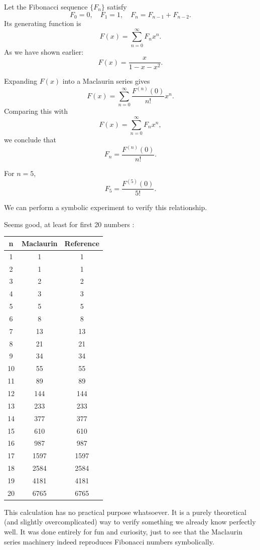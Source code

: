 \documentclass{article}
\begin{document}
Let the Fibonacci sequence \(\{F_n\}\) satisfy
\[
F_0 = 0, \quad F_1 = 1, \quad F_{n} = F_{n-1} + F_{n-2}.
\]
Its generating function is
\[
F(x) = \sum_{n=0}^{\infty} F_n x^n.
\]
As we have shown earlier:
\[
F(x) = \frac{x}{1 - x - x^2}.
\]

Expanding \(F(x)\) into a Maclaurin series gives
\[
F(x) = \sum_{n=0}^{\infty} \frac{F^{(n)}(0)}{n!} x^n.
\]
Comparing this with
\[
F(x) = \sum_{n=0}^{\infty} F_n x^n,
\]
we conclude that
\[
F_n = \frac{F^{(n)}(0)}{n!}.
\]

For \( n = 5 \),
\[
F_5 = \frac{F^{(5)}(0)}{5!}.
\]

We can perform a symbolic experiment to verify this relationship.

Seems good, at least for first 20 numbers : \\
\begin{center}
\begin{tabular}{c|c|c}
	n & Maclaurin & Reference \\
	\hline
	1 & 1 & 1 \\
	2 & 1 & 1 \\
	3 & 2 & 2 \\
	4 & 3 & 3 \\
	5 & 5 & 5 \\
	6 & 8 & 8 \\
	7 & 13 & 13 \\
	8 & 21 & 21 \\
	9 & 34 & 34 \\
	10 & 55 & 55 \\
	11 & 89 & 89 \\
	12 & 144 & 144 \\
	13 & 233 & 233 \\
	14 & 377 & 377 \\
	15 & 610 & 610 \\
	16 & 987 & 987 \\
	17 & 1597 & 1597 \\
	18 & 2584 & 2584 \\
	19 & 4181 & 4181 \\
	20 & 6765 & 6765 \\
\end{tabular}
\end{center}

This calculation has no practical purpose whatsoever.  
It is a purely theoretical (and slightly overcomplicated) way to verify something we already know perfectly well.  
It was done entirely for fun and curiosity, just to see that the Maclaurin series machinery indeed reproduces Fibonacci numbers symbolically.
\end{document}
